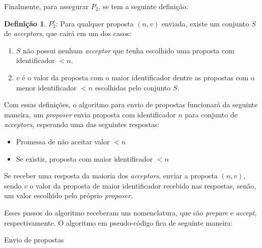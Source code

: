 \documentclass[12pt,
openright, 
oneside,
a4paper,
brazil]{facom-ufu-abntex2}
\theoremstyle{definition}
\newtheorem*{definition}{Definição}
\begin{document}
Finalmente, para assegurar $P_2$, se tem a seguinte definição:

\begin{definition}
$P_2^c$: Para qualquer proposta $(n, v)$ enviada, existe um conjunto $S$ de
\textit{acceptors}, que cairá em um dos casos:

\begin{enumerate}
    \item $S$ não possui nenhum \textit{acceptor} que tenha escolhido uma proposta com 
identificador $<n$.

    \item $v$ é o valor da proposta com o maior identificador dentre as propostas com o 
menor identificador $<n$ escolhidas pelo conjunto $S$.
\end{enumerate}
\end{definition}

Com essas definições, o algoritmo para envio de propostas funcionará da seguinte maneira,
um \textit{proposer} envia proposta com identificador $n$ para conjunto de 
\textit{acceptors}, esperando uma das seguintes respostas:

\begin{itemize}
    \item Promessa de não aceitar valor $<n$
    \item Se existir, proposta com maior identificador $<n$
\end{itemize}

Se receber uma resposta da maioria dos \textit{acceptors}, enviar a proposta
$(n, v)$, sendo $v$ o valor da proposta de maior identificador recebido nas respostas,
senão, um valor escolhido pelo próprio \textit{proposer}.

Esses passos do algoritmo receberam um nomenclatura, que são \textit{prepare} e
\textit{accept}, respectivamente. O algoritmo em pseudo-código fica de seguinte maneira:

\begin{algorithm}[H]
\caption{Envio de propostas}
\SetAlgoLined
{}
\end{algorithm}
\end{document}
